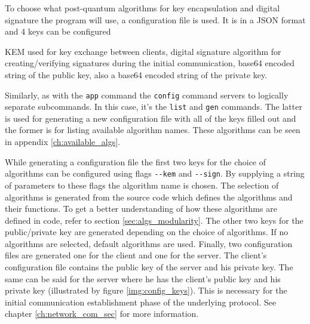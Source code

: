 To choose what post-quantum algorithms for key encapsulation and digital signature the program will use, a configuration file is used. It is in a JSON format and 4 keys can be configured
\begin{itemize}
  KEM used for key exchange between clients,
  digital signature algorithm for creating/verifying signatures during the initial communication,
  base64 encoded string of the public key,
  also a base64 encoded string of the private key.
\end{itemize}
Similarly, as with the \texttt{app} command the \texttt{config} command servers to logically separate subcommands. In this case, it's the \texttt{list} and \texttt{gen} commands. The latter is used for generating a new configuration file with all of the keys filled out and the former is for listing available algorithm names. These algorithms can be seen in appendix \ref{ch:available_algs}.

While generating a configuration file the first two keys for the choice of algorithms can be configured using flags \texttt{-\--kem} and \texttt{-\--sign}. By supplying a string of parameters to these flags the algorithm name is chosen. The selection of algorithms is generated from the source code which defines the algorithms and their functions. To get a better understanding of how these algorithms are defined in code, refer to section \ref{sec:algs_modularity}. The other two keys for the public/private key are generated depending on the choice of algorithms. If no algorithms are selected, default algorithms are used. Finally, two configuration files are generated one for the client and one for the server. The client's configuration file contains the public key of the server and his private key. The same can be said for the server where he has the client's public key and his private key (illustrated by figure \ref{img:config_keys}). This is necessary for the initial communication establishment phase of the underlying protocol. See chapter \ref{ch:network_com_sec} for more information.
